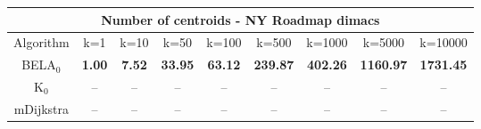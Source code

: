 \begin{tabular}{c|cccccccc}\toprule
\multicolumn{9}{c}{Number of centroids - NY Roadmap dimacs}\\ \midrule
Algorithm & k=1 & k=10 & k=50 & k=100 & k=500 & k=1000 & k=5000 & k=10000 \\ \midrule
BELA$_0$ & \textbf{1.00} & \textbf{7.52} & \textbf{33.95} & \textbf{63.12} & \textbf{239.87} & \textbf{402.26} & \textbf{1160.97} & \textbf{1731.45} \\
K$_0$ & -- & -- & -- & -- & -- & -- & -- & -- \\
mDijkstra & -- & -- & -- & -- & -- & -- & -- & -- \\ \bottomrule 
\end{tabular}
